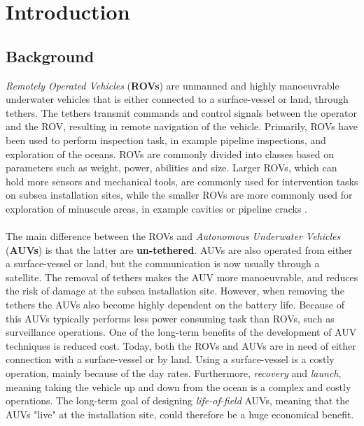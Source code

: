 \chapter{Introduction}
\section{Background}
\textit{Remotely Operated Vehicles} (\textbf{ROVs}) are unmanned and highly manoeuvrable underwater vehicles that is either connected to a surface-vessel or land, through tethers. The tethers transmit commands and control signals between the operator and the ROV, resulting in remote navigation of the vehicle. Primarily, ROVs have been used to perform inspection task, in example pipeline inspections, and exploration of the oceans. ROVs are commonly divided into classes based on parameters such as weight, power, abilities and size. Larger ROVs, which can hold more sensors and mechanical tools, are commonly used for intervention tasks on subsea installation sites, while the smaller ROVs are more commonly used for exploration of minuscule areas, in example cavities or pipeline cracks \cite{Dasgupta}.\\\\
The main difference between the ROVs and \textit{Autonomous Underwater Vehicles} (\textbf{AUVs}) is that the latter are \textbf{un-tethered}. AUVs are also operated from either a surface-vessel or land, but the communication is now usually through a satellite. The removal of tethers makes the AUV more manoeuvrable, and reduces the risk of damage at the subsea installation site. However, when removing the tethers the AUVs also become highly dependent on the battery life. Because of this AUVs typically performs less power consuming task than ROVs, such as surveillance operations. One of the long-term benefits of the development of AUV techniques is reduced cost. Today, both the ROVs and AUVs are in need of either connection with a surface-vessel or by land. Using a surface-vessel is a costly operation, mainly because of the day rates. Furthermore, \textit{recovery} and \textit{launch}, meaning taking the vehicle up and down from the ocean is a complex and costly operations. The long-term goal of designing \textit{life-of-field} AUVs, meaning that the AUVs "live" at the installation site, could therefore be a huge economical benefit. 
